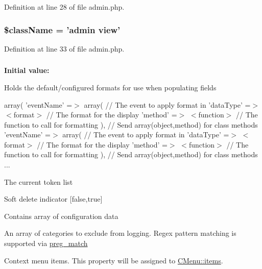 Definition at line 28 of file admin.php.

\hypertarget{admin_8php_acd6a475a6eeb092f4eea3e19e502d67d}{
\subsubsection[{\$className}]{\setlength{\rightskip}{0pt plus 5cm}\$className = 'admin view'}}
\label{admin_8php_acd6a475a6eeb092f4eea3e19e502d67d}


Definition at line 33 of file admin.php.

\hypertarget{admin_8php_a2394bd91cde70158acb50a4a7f860ab5}{
\subsubsection[{array}]{}}
\label{admin_8php_a2394bd91cde70158acb50a4a7f860ab5}
{\bfseries Initial value:}
Holds the default/configured formats for use when populating fields

array( 'eventName' =$>$ array( // The event to apply format in 'dataType' =$>$ $<$format$>$ // The format for the display 'method' =$>$ $<$function$>$ // The function to call for formatting ), // Send array(object,method) for class methods 'eventName' =$>$ array( // The event to apply format in 'dataType' =$>$ $<$format$>$ // The format for the display 'method' =$>$ $<$function$>$ // The function to call for formatting ), // Send array(object,method) for class methods ...

The current token list

Soft delete indicator \mbox{[}false,true\mbox{]}

Contains array of configuration data

An array of categories to exclude from logging. Regex pattern matching is supported via \hyperlink{}{preg\_\-match}

Context menu items. This property will be assigned to \hyperlink{}{CMenu::items}.

